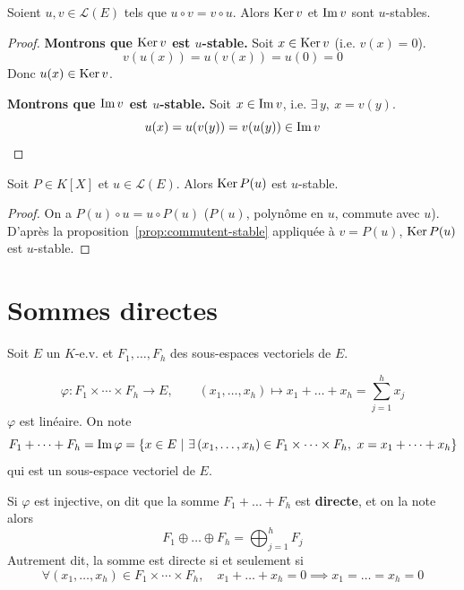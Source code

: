 \begin{prop}
\label{prop:commutent-stable}
Soient $u,v\in\mathcal{L}(E)$ tels que $u\circ v = v\circ u$. Alors $\operatorname{Ker} v$ et $\operatorname{Im} v$ sont $u$-stables.
\end{prop}

\begin{proof}
\textbf{Montrons que $\operatorname{Ker} v$ est $u$-stable.} Soit $x\in\operatorname{Ker} v$ (i.e. $v(x)=0$).
\[v(u(x)) = u(v(x)) = u(0) = 0\]
Donc $u(x)\in\operatorname{Ker} v$.

\textbf{Montrons que $\operatorname{Im} v$ est $u$-stable.} Soit $x\in\operatorname{Im} v$, i.e. $\exists\, y,\ x=v(y)$.
\[u(x) = u(v(y)) = v(u(y)) \in \operatorname{Im} v\]
\end{proof}

\begin{prop}
Soit $P\in K[X]$ et $u\in\mathcal{L}(E)$. Alors $\operatorname{Ker} P(u)$ est $u$-stable.
\end{prop}

\begin{proof}
On a $P(u)\circ u = u\circ P(u)$ ($P(u)$, polynôme en $u$, commute avec $u$). D'après la proposition~\ref{prop:commutent-stable} appliquée à $v=P(u)$, $\operatorname{Ker} P(u)$ est $u$-stable.
\end{proof}

\section{Sommes directes}

Soit $E$ un $K$-e.v. et $F_1,\dots,F_h$ des sous-espaces vectoriels de $E$.

\begin{defi}
\label{defi:somme}
\[\varphi : F_1\times\cdots\times F_h \to E, \qquad (x_1,\dots,x_h) \mapsto x_1+\dots+x_h = \sum_{j=1}^{h} x_j\]
$\varphi$ est linéaire. On note
\[F_1+\dots+F_h = \operatorname{Im}\varphi = \left\{x\in E \ \middle|\ \exists\,(x_1,\dots,x_h)\in F_1\times\cdots\times F_h,\ x=x_1+\dots+x_h\right\}\]
qui est un sous-espace vectoriel de $E$.
\end{defi}

\begin{defi}
\label{defi:somme-directe}
Si $\varphi$ est injective, on dit que la somme $F_1+\dots+F_h$ est \textbf{directe}, et on la note alors
\[F_1\oplus\dots\oplus F_h = \bigoplus_{j=1}^{h} F_j\]
Autrement dit, la somme est directe si et seulement si
\[\forall (x_1,\dots,x_h)\in F_1\times\cdots\times F_h,\quad x_1+\dots+x_h=0 \implies x_1=\dots=x_h=0\]
\end{defi}

